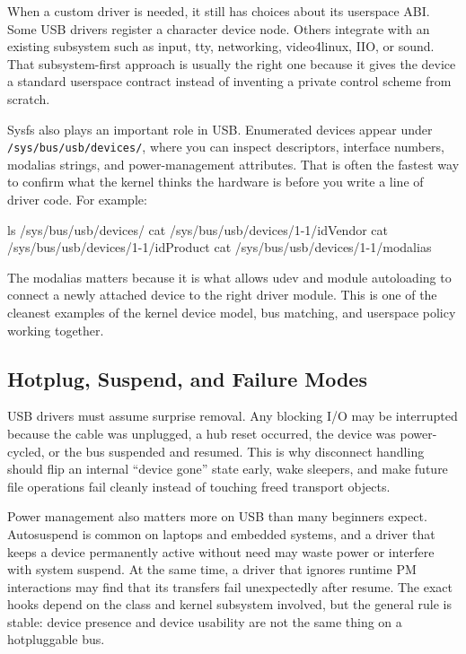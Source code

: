 \documentclass[10pt, oneside]{book}
\begin{document}
When a custom driver is needed, it still has choices about its userspace ABI.
Some USB drivers register a character device node.
Others integrate with an existing subsystem such as input, tty, networking,
video4linux, IIO, or sound.
That subsystem-first approach is usually the right one because it gives the
device a standard userspace contract instead of inventing a private control
scheme from scratch.

Sysfs also plays an important role in USB.
Enumerated devices appear under \verb|/sys/bus/usb/devices/|, where you can
inspect descriptors, interface numbers, modalias strings, and power-management
attributes.
That is often the fastest way to confirm what the kernel thinks the hardware is
before you write a line of driver code.
For example:
\begin{codebash}
ls /sys/bus/usb/devices/
cat /sys/bus/usb/devices/1-1/idVendor
cat /sys/bus/usb/devices/1-1/idProduct
cat /sys/bus/usb/devices/1-1/modalias
\end{codebash}

The modalias matters because it is what allows udev and module autoloading to
connect a newly attached device to the right driver module.
This is one of the cleanest examples of the kernel device model, bus matching,
and userspace policy working together.

\subsection{Hotplug, Suspend, and Failure Modes}
\label{sec:usb_hotplug}
USB drivers must assume surprise removal.
Any blocking I/O may be interrupted because the cable was unplugged, a hub reset
occurred, the device was power-cycled, or the bus suspended and resumed.
This is why disconnect handling should flip an internal ``device gone'' state
early, wake sleepers, and make future file operations fail cleanly instead of
touching freed transport objects.

Power management also matters more on USB than many beginners expect.
Autosuspend is common on laptops and embedded systems, and a driver that keeps a
device permanently active without need may waste power or interfere with system
suspend.
At the same time, a driver that ignores runtime PM interactions may find that
its transfers fail unexpectedly after resume.
The exact hooks depend on the class and kernel subsystem involved, but the
general rule is stable: device presence and device usability are not the same
thing on a hotpluggable bus.
\end{document}
